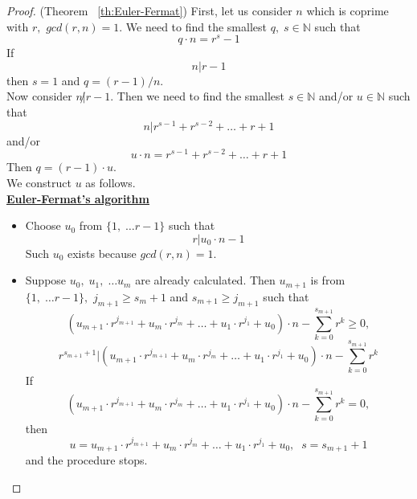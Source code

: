 \documentclass[color=black,11pt]{elegantpaper}
\begin{document}
\begin{proof}(Theorem ~\ref{th:Euler-Fermat})
First, let us consider $n$ which is coprime with $r,$ $gcd(r,n)=1.$ We need to find the smallest $q,\;s\in \mathbb{N}$ such that
\begin{equation}
\label{formula:improved_Euler}
q\cdot n = r^s - 1
\end{equation}
If
$$
n|r-1
$$
then $s=1$ and $q=(r-1)/n.$\\
Now consider $n\not| r-1.$ Then we need to find the smallest $s\in \mathbb{N}$ and/or $u\in \mathbb{N}$ such that
$$
n|r^{s-1}+r^{s-2}+\dots + r+1
$$
and/or
\begin{equation}
\label{formula:main}
u\cdot n = r^{s-1}+r^{s-2}+\dots + r+1
\end{equation}
Then $q = (r-1) \cdot u.$\\ 
We construct $u$ as follows.\\
{\bf \underline{Euler-Fermat's algorithm}} 
\begin{itemize}
\item Choose $u_0$ from $\{1,\;\dots r-1\}$ such that
$$
r | u_0 \cdot n - 1
$$
Such $u_0$ exists because $gcd(r,n)=1.$
\item Suppose $u_0,\;u_1,\;\dots u_m$ are already calculated. Then $u_{m+1}$ is from $\{1,\;\dots r-1\},$ $j_{m+1}\ge s_m+1$ and $s_{m+1}\ge j_{m+1}$ such that
$$
(u_{m+1} \cdot r^{j_{m+1}}+u_m \cdot r^{j_m} + \dots+u_1 \cdot r^{j_1} + u_0) \cdot n - \sum_{k=0}^{s_{m+1}} r^k \ge 0, 
$$
$$
r^{s_{m+1} +1} | (u_{m+1} \cdot r^{j_{m+1}}+u_m \cdot r^{j_m} + \dots+u_1 \cdot r^{j_1} + u_0) \cdot n - \sum_{k=0}^{s_{m+1}} r^k 
$$
If 
$$
(u_{m+1} \cdot r^{j_{m+1}}+u_m \cdot r^{j_m} + \dots+u_1 \cdot r^{j_1} + u_0) \cdot n - \sum_{k=0}^{s_{m+1}} r^k = 0, 
$$
then
$$
u = u_{m+1} \cdot r^{j_{m+1}}+u_m \cdot r^{j_m} + \dots+u_1 \cdot r^{j_1} + u_0,\;\;s = s_{m+1} + 1 
$$
and the procedure stops.
 
\end{itemize}


\end{proof}
\end{document}

